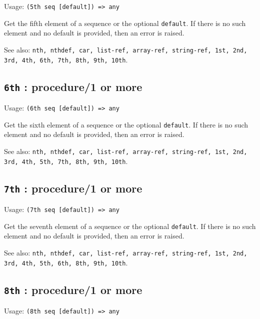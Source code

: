 \documentclass[
]{article}
\newcommand{\passthrough}[1]{#1}
\begin{document}
Usage: \passthrough{\lstinline!(5th seq [default]) => any!}

Get the fifth element of a sequence or the optional
\passthrough{\lstinline!default!}. If there is no such element and no
default is provided, then an error is raised.

See also:
\passthrough{\lstinline!nth, nthdef, car, list-ref, array-ref, string-ref, 1st, 2nd, 3rd, 4th, 6th, 7th, 8th, 9th, 10th!}.

\hypertarget{th-procedure1-or-more-10}{%
\subsection{\texorpdfstring{\texttt{6th} : procedure/1 or
more}{6th : procedure/1 or more}}\label{th-procedure1-or-more-10}}

Usage: \passthrough{\lstinline!(6th seq [default]) => any!}

Get the sixth element of a sequence or the optional
\passthrough{\lstinline!default!}. If there is no such element and no
default is provided, then an error is raised.

See also:
\passthrough{\lstinline!nth, nthdef, car, list-ref, array-ref, string-ref, 1st, 2nd, 3rd, 4th, 5th, 7th, 8th, 9th, 10th!}.

\hypertarget{th-procedure1-or-more-11}{%
\subsection{\texorpdfstring{\texttt{7th} : procedure/1 or
more}{7th : procedure/1 or more}}\label{th-procedure1-or-more-11}}

Usage: \passthrough{\lstinline!(7th seq [default]) => any!}

Get the seventh element of a sequence or the optional
\passthrough{\lstinline!default!}. If there is no such element and no
default is provided, then an error is raised.

See also:
\passthrough{\lstinline!nth, nthdef, car, list-ref, array-ref, string-ref, 1st, 2nd, 3rd, 4th, 5th, 6th, 8th, 9th, 10th!}.

\hypertarget{th-procedure1-or-more-12}{%
\subsection{\texorpdfstring{\texttt{8th} : procedure/1 or
more}{8th : procedure/1 or more}}\label{th-procedure1-or-more-12}}

Usage: \passthrough{\lstinline!(8th seq [default]) => any!}
\end{document}
